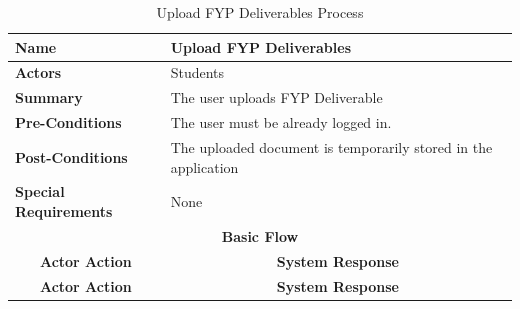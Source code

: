 \documentclass{FastFyp}
\begin{document}
\begin{longtable}{|lllll|}
\caption{Upload FYP Deliverables Process} \label{tab:delete-fyp-post} \\ \hline
\multicolumn{2}{|l|}{\textbf{Name}} &
  \multicolumn{3}{l|}{Upload FYP Deliverables} \\ \hline
\multicolumn{2}{|l|}{\textbf{Actors}} &
  \multicolumn{3}{l|}{Students} \\ \hline
\multicolumn{2}{|l|}{\textbf{Summary}} &
  \multicolumn{3}{l|}{The user uploads FYP Deliverable} \\ \hline
\multicolumn{2}{|l|}{\textbf{Pre-Conditions}} &
  \multicolumn{3}{l|}{The user must be already logged in.} \\ \hline
\multicolumn{2}{|l|}{\textbf{Post-Conditions}} &
  \multicolumn{3}{l|}{The uploaded document is temporarily stored in the application} \\ \hline
\multicolumn{2}{|l|}{\textbf{Special Requirements}} &
  \multicolumn{3}{l|}{None} \\ \hline
\multicolumn{5}{|c|}{\textbf{Basic Flow}} \\ \hline
\multicolumn{3}{|c|}{\textbf{Actor Action}} &
  \multicolumn{2}{c|}{\textbf{System Response}} \\ \hline
\endfirsthead %
\hline
\multicolumn{3}{|c|}{\textbf{Actor Action}} &
  \multicolumn{2}{c|}{\textbf{System Response}} \\ \hline
\endhead %


\end{longtable}
\end{document}
